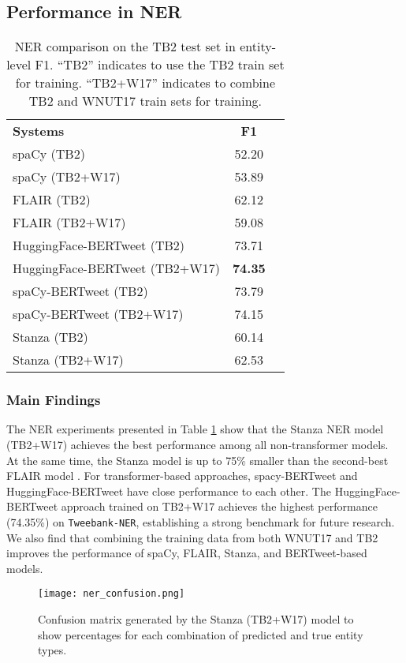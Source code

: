 \documentclass[10pt, a4paper]{article}
\begin{document}
\subsection{Performance in NER}

\begin{table}[h]
\centering
\begin{tabular}{l|cc}
\textbf{Systems} & \textbf{F1}\\ \Xhline{2\arrayrulewidth}
spaCy (TB2) & 52.20\\
spaCy (TB2+W17) & 53.89\\
FLAIR (TB2) & 62.12\\
FLAIR (TB2+W17) & 59.08 \\
\hdashline
HuggingFace-BERTweet (TB2) & 73.71 \\
HuggingFace-BERTweet (TB2+W17) & \textbf{74.35} \\
spaCy-BERTweet (TB2) & 73.79 \\
spaCy-BERTweet (TB2+W17) & 74.15 \\
\hline
Stanza (TB2) & 60.14 \\
Stanza (TB2+W17) &62.53
\end{tabular}
\caption{NER comparison on the TB2 test set in entity-level F1. ``TB2'' indicates to use the TB2 train set for training. ``TB2+W17'' indicates to combine TB2 and WNUT17 train sets for training. }
\label{tab:NER}
\end{table}

\subsubsection{Main Findings}
The NER experiments presented in Table \ref{tab:NER} show that the Stanza NER model (TB2+W17) achieves the best performance among all non-transformer models. At the same time, the Stanza model is up to 75\% smaller than the second-best FLAIR model \cite{qi2020stanza}. For transformer-based approaches, spacy-BERTweet and HuggingFace-BERTweet have close performance to each other. The HuggingFace-BERTweet approach trained on TB2+W17 achieves the highest performance (74.35\%) on \texttt{Tweebank-NER}, establishing a strong benchmark for future research. We also find that combining the training data from both WNUT17 and TB2 improves the performance of spaCy, FLAIR, Stanza, and BERTweet-based models. 






\begin{figure}[ht]
\begin{center}
\texttt{[image: ner\_confusion.png]} 
\end{center}
\caption{Confusion matrix generated by the Stanza (TB2+W17) model to show percentages for each combination of predicted and true entity types.}
\label{fig:ner}
\end{figure}
\end{document}
